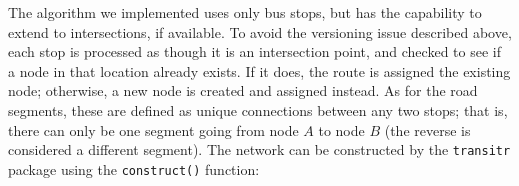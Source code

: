 The algorithm we implemented uses only bus stops, but has the capability to extend to intersections, if available. To avoid the versioning issue described above, each stop is processed as though it is an intersection point, and checked to see if a node in that location already exists. If it does, the route is assigned the existing node; otherwise, a new node is created and assigned instead. As for the road segments, these are defined as unique connections between any two stops; that is, there can only be one segment going from node $A$ to node $B$ (the reverse is considered a different segment). The network can be constructed by the \verb+transitr+ package using the \verb+construct()+ function:
\begin{knitrout}\small
{}\color{fgcolor}
\end{knitrout}
